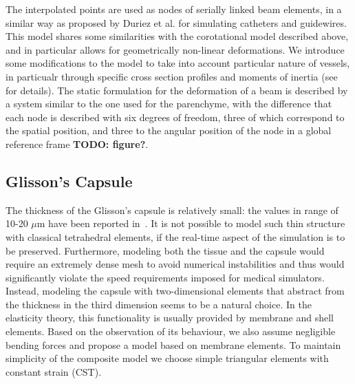 \documentclass[final,3p,times,twocolumn]{elsarticle}
\newcommand{\TODO}[1]{{\color{red}\textbf{TODO: #1}}}
\begin{document}
The interpolated points are used as nodes of serially linked beam elements,
in a similar way as proposed by Duriez et al. \cite{Duriez2006} for
simulating catheters and guidewires. This model shares some similarities
with the corotational model described above, and in particular allows for
geometrically non-linear deformations. We introduce some modifications to
the model to take into account particular nature of vessels, in particualr
through specific cross section profiles and moments of inertia (see
\cite{Przemieniecki1985} for details). The static formulation for the
deformation of a beam is described by a system similar to the one used for
the parenchyme, with the difference that each node is described with six
degrees of freedom, three of which correspond to the spatial position, and
three to the angular position of the node in a global reference frame
\TODO{figure?}.





\subsection{Glisson's Capsule} %
\label{ss:capsuleModel}
The thickness of the Glisson's capsule is relatively small: the values in range of 10-20
$\mu$m have been reported in~\cite{Umale2011}.
It is not possible to model such thin structure with classical tetrahedral
elements, if the real-time aspect of the simulation is to be preserved.
Furthermore, modeling both the tissue and the capsule would require an extremely 
dense mesh to avoid numerical instabilities and thus would significantly
violate the speed requirements imposed for medical simulators.
Instead, modeling the capsule with two-dimensional elements that abstract from the
thickness in the third dimension seems
to be a natural choice. In the elasticity theory, this functionality is usually provided by membrane and shell elements.
Based on the observation of its behaviour, we also
assume negligible bending forces and propose a model based on membrane
elements. 
To maintain simplicity of the composite model we choose simple triangular
elements with constant strain (CST).
\end{document}

